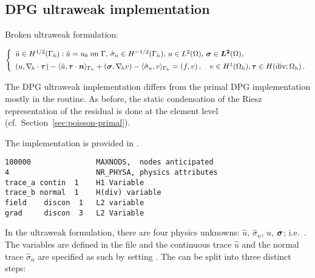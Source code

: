 %
%


\subsection{DPG ultraweak implementation}
\label{sec:poisson-ultraweak}
Broken ultraweak formulation:

\[
\left\{
\begin{array}{llll}
	\hat u \in H^{1/2}(\Gamma_h): \hat u = u_0 \text{ on } \Gamma,\,
	\hat{\sigma}_n \in H^{-1/2}(\Gamma_h),\,
	u \in L^2(\Omega),\,
	\boldsymbol \sigma \in \boldsymbol{L^2}(\Omega) , \\[5pt]
	(u, \nabla_{\hskip -1pt h} \cdot \boldsymbol \tau)
	- \langle \hat u, \boldsymbol \tau \cdot \boldsymbol n \rangle_{\Gamma_h}
	+ (\boldsymbol \sigma, \nabla_{\hskip -1pt h} v)
	- \langle \hat{\sigma}_n , v \rangle_{\Gamma_h}
	= (f,v) \, ,\quad
	v \in H^1(\Omega_h), 
	\boldsymbol \tau \in H(\text{div}; \Omega_h) \, .
\end{array}
\right.
\]

The DPG ultraweak implementation differs from the primal DPG implementation mostly in the  routine. As before, the static condensation of the Riesz representation of the residual is done at the element level (cf.~Section~\ref{sec:poisson-primal}). 

The implementation is provided in .

\begin{lstlisting}[caption=\file{POISSON/ULTRAWEAK\_DPG/input/physics} input file.]
100000               MAXNODS,  nodes anticipated
4                    NR_PHYSA, physics attributes
trace_a contin  1    H1 Variable
trace_b normal  1    H(div) variable
field    discon  1   L2 variable
grad     discon  3   L2 Variable
\end{lstlisting}

In the ultraweak formulation, there are four physics unknowns: $\hat u$, $\hat{\sigma}_n$, $u$, $\boldsymbol \sigma$; i.e.~. The variables are defined in the  file and the continuous trace $\hat u$ and the normal trace $\hat \sigma_n$ are specified as such by setting . The  can be split into three distinct steps:

